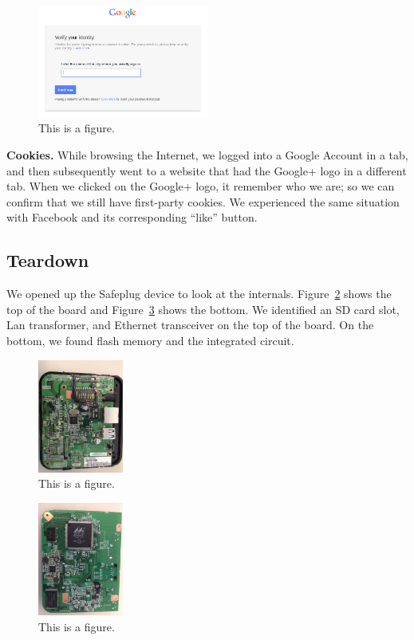 \begin{figure}[htb]
\begin{center}
\includegraphics[width=0.5\textwidth]{funnygoogle}
\caption{This is a figure.}
\label{fig:funnygoogle}
\end{center}
\end{figure}

{\bf Cookies.}  While browsing the Internet, we logged into a Google Account in a tab, and then subsequently went to a website that had the Google+ logo in a different tab.  When we clicked on the Google+ logo, it remember who we are; so we can confirm that we still have first-party cookies.  We experienced the same situation with Facebook and its corresponding ``like'' button.

\subsection{Teardown}
\label{sec:tear}
We opened up the Safeplug device to look at the internals.  Figure~\ref{fig:top} shows the top of the board and Figure~\ref{fig:bottom} shows the bottom.  We identified an SD card slot, Lan transformer, and Ethernet transceiver on the top of the board.  On the bottom, we found flash memory and the integrated circuit.

\begin{figure}[htb]
\begin{center}
\includegraphics[width=0.25\textwidth]{safeplug_top}
\caption{This is a figure.}
\label{fig:top}
\end{center}
\end{figure}

\begin{figure}[htb]
\begin{center}
\includegraphics[width=0.25\textwidth]{safeplug_bottom}
\caption{This is a figure.}
\label{fig:bottom}
\end{center}
\end{figure}
